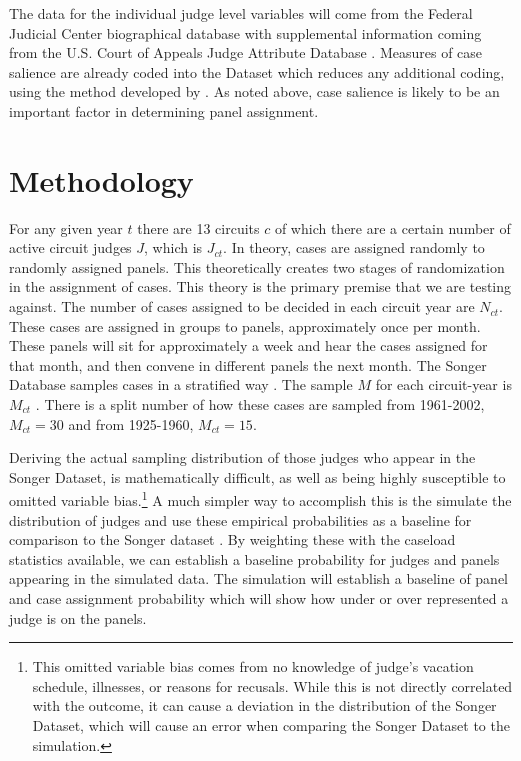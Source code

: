 \documentclass[12pt]{article}
\begin{document}
The data for the individual judge level variables will come from the Federal Judicial Center biographical database with supplemental information coming from the U.S. Court of Appeals Judge Attribute Database \citep{FJC}. Measures of case salience are already coded into the \citeauthor{Songer2007} Dataset which reduces any additional coding, using the method developed by \cite{Hettinger2003}.  As noted above, case salience is likely to be an important factor in determining panel assignment.

\section{Methodology}\label{Methods}
For any given year $t$ there are 13 circuits $c$ of which there are a certain number of active circuit judges $J$, which is $J_{ct}$.  In theory, cases are assigned randomly to randomly assigned panels.  This theoretically creates two stages of randomization in the assignment of cases.  This theory is the primary premise that we are testing against.  The number of cases assigned to be decided in each circuit year are $N_{ct}$.  These cases are assigned in groups to panels, approximately once per month.  These panels will sit for approximately a week and hear the cases assigned for that month, and then convene in different panels the next month.  The Songer Database samples cases in a stratified way \citep{Songer2007}.  The sample $M$ for each circuit-year is $M_{ct}$ \citep{Songer2007}.  There is a split number of how these cases are sampled from 1961-2002, $M_{ct}=30$ and from 1925-1960, $M_{ct}=15$.  

Deriving the actual sampling distribution of those judges who appear in the Songer Dataset, is mathematically difficult, as well as being highly susceptible to omitted variable bias.\footnote{This omitted variable bias comes from no knowledge of judge's vacation schedule, illnesses, or reasons for recusals.  While this is not directly correlated with the outcome, it can cause a deviation in the distribution of the Songer Dataset, which will cause an error when comparing the Songer Dataset to the simulation.}  A much simpler way to accomplish this is the simulate the distribution of judges and use these empirical probabilities as a baseline for comparison to the Songer dataset \citep{Songer2007}.  By weighting these with the caseload statistics available, we can establish a baseline probability for judges and panels appearing in the simulated data. The simulation will establish a baseline of panel and case assignment probability which will show how under or over represented a judge is on the panels. 
\end{document}
